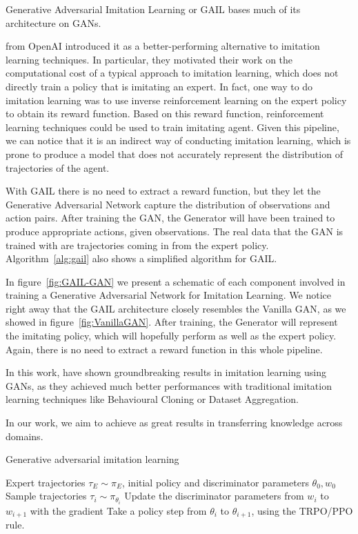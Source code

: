Generative Adversarial Imitation Learning \citep{ho2016generative} or GAIL bases much of its architecture on GANs.

\citeauthor{ho2016generative} from OpenAI introduced it as a better-performing alternative to imitation learning techniques. In particular, they motivated their work on the computational cost of a typical approach to imitation learning, which does not directly train a policy that is imitating an expert.
In fact, one way to do imitation learning was to use inverse reinforcement learning on the expert policy to obtain its reward function. Based on this reward function, reinforcement learning techniques could be used to train imitating agent. Given this pipeline, we can notice that it is an indirect way of conducting imitation learning, which is prone to produce a model that does not accurately represent the distribution of trajectories of the agent.

With GAIL there is no need to extract a reward function, but they let the Generative Adversarial Network capture the distribution of observations and action pairs. After training the GAN, the Generator will have been trained to produce appropriate actions, given observations. The real data that the GAN is trained with are trajectories coming in from the expert policy. Algorithm~\ref{alg:gail} also shows a simplified algorithm for GAIL.

In figure~\ref{fig:GAIL-GAN} we present a schematic of each component involved in training a Generative Adversarial Network for Imitation Learning. We notice right away that the GAIL architecture closely resembles the Vanilla GAN, as we showed in figure~\ref{fig:VanillaGAN}. After training, the Generator will represent the imitating policy, which will hopefully perform as well as the expert policy. Again, there is no need to extract a reward function in this whole pipeline.

In this work, \citeauthor{ho2016generative} have shown groundbreaking results in imitation learning using GANs, as they achieved much better performances with traditional imitation learning techniques like Behavioural Cloning or Dataset Aggregation.

In our work, we aim to achieve as great results in transferring knowledge across domains.

\begin{algorithm}[tb]
    \caption{Generative adversarial imitation learning}
    \label{alg:gail}
    \begin{algorithmic}[1]
        Expert trajectories $\tau_E \sim \pi_E$, initial policy and discriminator parameters $\theta_0, w_0$
           \STATE Sample trajectories $\tau_i \sim \pi_{\theta_i}$
           \STATE Update the discriminator parameters from $w_i$ to $w_{i+1}$ with the gradient
           \STATE Take a policy step from $\theta_i$ to $\theta_{i+1}$, using the TRPO/PPO rule.
       \ENDFOR
    \end{algorithmic}
\end{algorithm}


